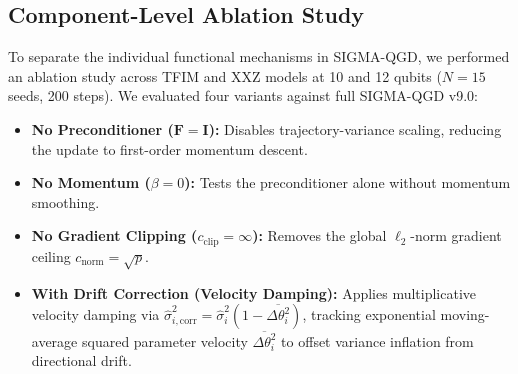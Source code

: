 \documentclass[11pt,a4paper]{article}
\begin{document}
\subsection{Component-Level Ablation Study}
\label{sec:ablation_results}
To separate the individual functional mechanisms in SIGMA-QGD, we performed an ablation study across TFIM and XXZ models at 10 and 12 qubits ($N=15$ seeds, 200 steps). We evaluated four variants against full SIGMA-QGD v9.0:
\begin{itemize}
    \item \textbf{No Preconditioner ($\mathbf{F}=\mathbf{I}$):} Disables trajectory-variance scaling, reducing the update to first-order momentum descent.
    \item \textbf{No Momentum ($\beta=0$):} Tests the preconditioner alone without momentum smoothing.
    \item \textbf{No Gradient Clipping ($c_{\text{clip}}=\infty$):} Removes the global $\ell_2$-norm gradient ceiling $c_{\text{norm}} = \sqrt{p}$.
    \item \textbf{With Drift Correction (Velocity Damping):} Applies multiplicative velocity damping via $\hat{\sigma}_{i,\text{corr}}^2 = \hat{\sigma}_i^2(1 - \overline{\Delta \theta_i^2})$, tracking exponential moving-average squared parameter velocity $\overline{\Delta \theta_i^2}$ to offset variance inflation from directional drift.
\end{itemize}
\end{document}
